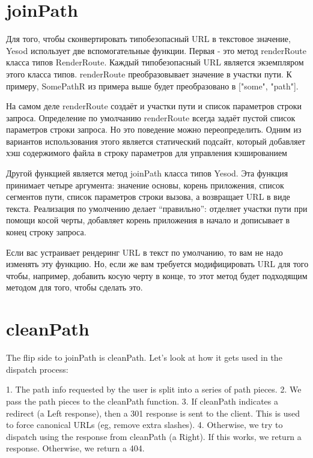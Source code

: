 \section {joinPath}

Для того, чтобы сконвертировать типобезопасный URL в текстовое значение, Yesod использует две вспомогательные функции. Первая - это метод renderRoute класса типов RenderRoute. Каждый типобезопасный URL является экземпляром этого класса типов. renderRoute преобразовывает значение в участки пути. К примеру, SomePathR из примера выше будет преобразовано в ["some", "path"].

На самом деле renderRoute создаёт и участки пути и список параметров строки запроса. Определение по умолчанию renderRoute всегда задаёт пустой список параметров строки запроса. Но это поведение можно переопределить. Одним из вариантов использования этого является статический подсайт, который добавляет хэш содержимого файла в строку параметров для управления кэшированием

Другой функцией является метод joinPath класса типов Yesod. Эта функция принимает четыре аргумента: значение основы, корень приложения, список сегментов пути, список параметров строки вызова, а возвращает URL в виде текста. Реализация по умолчению делает ``правильно'': отделяет участки пути при помощи косой черты, добавляет корень приложения в начало и дописывает в конец строку запроса.

Если вас устраивает рендеринг URL в текст по умолчанию, то вам не надо изменять эту функцию. Но, если же вам требуется модифицировать URL для того чтобы, например, добавить косую черту в конце, то этот метод будет подходящим методом для того, чтобы сделать это.

\section {cleanPath}

The flip side to joinPath is cleanPath. Let's look at how it gets used in the dispatch process:

1. The path info requested by the user is split into a series of path pieces.
2. We pass the path pieces to the cleanPath function.
3. If cleanPath indicates a redirect (a Left response), then a 301 response is sent to the client. This is used to force canonical URLs (eg, remove extra slashes).
4. Otherwise, we try to dispatch using the response from cleanPath (a Right). If this works, we return a response. Otherwise, we return a 404.

